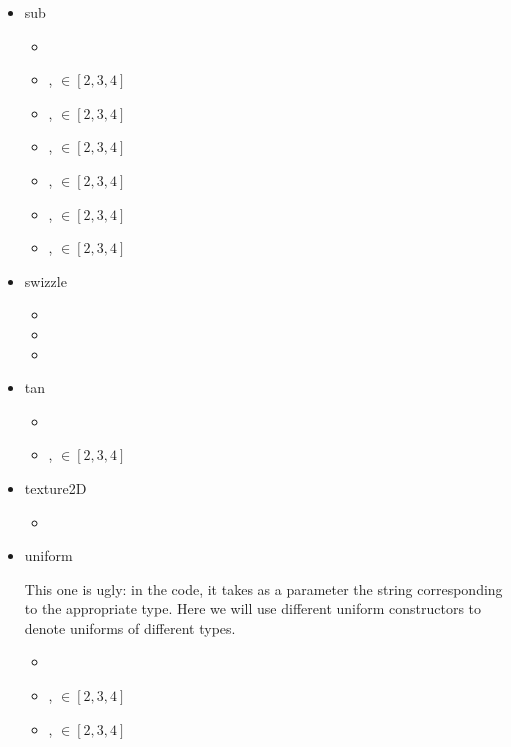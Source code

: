 \documentclass{article}
\begin{document}
\begin{itemize}
\begin{itemize}
\end{itemize}\item sub \begin{itemize}
\item {}
\item {},  $\in [2, 3, 4]$
\item {},  $\in [2, 3, 4]$
\item {},  $\in [2, 3, 4]$
\item {},  $\in [2, 3, 4]$
\item {},  $\in [2, 3, 4]$
\item {},  $\in [2, 3, 4]$

\end{itemize}\item swizzle \begin{itemize}
\item {}
\item {}
\item {}

\end{itemize}\item tan \begin{itemize}
\item {}
\item {},  $\in [2, 3, 4]$

\end{itemize}\item texture2D \begin{itemize}
\item {}

\end{itemize}\item uniform

  This one is ugly: in the code, it takes as a parameter the string
  corresponding to the appropriate type. Here we will use different uniform
  constructors to denote uniforms of different types.
  
 \begin{itemize}
\item {}
\item {},  $\in [2, 3, 4]$
\item {},  $\in [2, 3, 4]$


\end{itemize}
\end{itemize}
\end{document}
